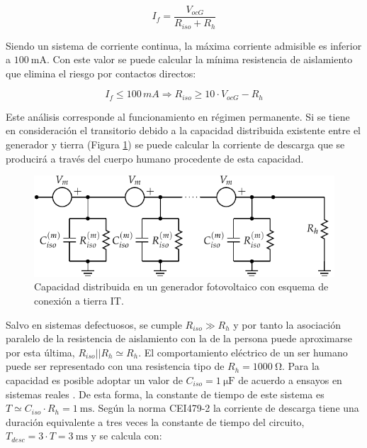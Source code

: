\begin{equation}
I_{f}=\frac{V_{ocG}}{R_{iso}+R_{h}}\label{eq:If_IT}\end{equation}


Siendo un sistema de corriente continua, la máxima corriente admisible
es inferior a $\SI{100}{\milli\ampere}$. Con este valor se puede
calcular la mínima resistencia de aislamiento que elimina el riesgo
por contactos directos:

\begin{equation}
I_{f}\leq100\, mA\Longrightarrow R_{iso}\geq10\cdot V_{ocG}-R_{h}\label{eq:Riso_IT}\end{equation}


Este análisis corresponde al funcionamiento en régimen permanente.
Si se tiene en consideración el transitorio debido a la capacidad
distribuida existente entre el generador y tierra (Figura \ref{fig:CapacidadIT})
se puede calcular la corriente de descarga que se producirá a través
del cuerpo humano procedente de esta capacidad. 

%
\begin{figure}
\includegraphics{../figs/ContactoDirectoIT_Capacidad}

\caption{Capacidad distribuida en un generador fotovoltaico con esquema de
conexión a tierra IT.\label{fig:CapacidadIT}}

\end{figure}


Salvo en sistemas defectuosos, se cumple $R_{iso}\gg R_{h}$ y por
tanto la asociación paralelo de la resistencia de aislamiento con la de la
persona puede aproximarse por esta última, $R_{iso}||R_{h} \simeq R_h$. El comportamiento
eléctrico de un ser humano puede ser representado con una resistencia
tipo de $R_{h}=\SI{1000}{\ohm}$. Para la capacidad es posible adoptar
un valor de $C_{iso}=\SI{1}{\micro\farad}$
de acuerdo a ensayos en sistemas reales \citep{Gomez-Vidal2000}.
De esta forma, la constante de tiempo de este sistema es $T\simeq C_{iso}\cdot R_{h}=\SI{1}{\milli\second}$.
Según la norma CEI479-2 la corriente de descarga tiene una duración
equivalente a tres veces la constante de tiempo del circuito, $T_{desc}=3\cdot T=\SI{3}{\milli\second}$
y se calcula con:

